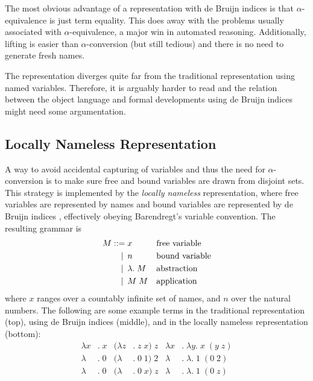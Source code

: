 \documentclass[a4paper,11pt]{article}
\begin{document}
The most obvious advantage of a representation with de Bruijn
indices is that $\alpha$-equivalence is just term equality.
This does away with the problems usually associated with
$\alpha$-equivalence, a major win in automated reasoning.
Additionally, lifting is easier than $\alpha$-conversion (but
still tedious) and there is no need to generate fresh names.

The representation diverges quite far from the traditional
representation using named variables.
Therefore, it is arguably harder to read and the relation
between the object language and formal developments using de
Bruijn indices might need some argumentation.


\subsection{Locally Nameless Representation}

A way to avoid accidental capturing of variables and thus the need for
$\alpha$-conversion is to make sure free and bound variables are drawn
from disjoint sets.
This strategy is implemented by the {\em locally nameless} representation,
where free variables are represented by names and bound variables are
represented by de Bruijn indices \cite{McBride-McKinna-04}, effectively
obeying Barendregt's variable convention.
The resulting grammar is
\begin{align*}
  M ::=             &\; x
  && \text{free variable} \\
  \llap{\textbar\:} &\; n
  && \text{bound variable} \\
  \llap{\textbar\:} &\; \lambda . \; M
    && \text{abstraction} \\
  \llap{\textbar\:} &\; M \; M
  && \text{application}
\end{align*}
where $x$ ranges over a countably infinite set of names, and $n$ over
the natural numbers.
The following are some example terms in the traditional representation
(top), using de Bruijn indices (middle), and in the locally nameless
representation (bottom):
\begin{align*}
  \lambda x&. \; x & (\lambda z&. \; z \; x) \; z & \lambda x&. \; \lambda y. \; x \; (y \; z)\\
  \lambda &. \; 0  & (\lambda &. \; 0 \; 1) \; 2  & \lambda &. \; \lambda . \; 1 \; (0 \; 2)\\
  \lambda &. \; 0  & (\lambda &. \; 0 \; x) \; z  & \lambda &. \; \lambda . \; 1 \; (0 \; z)
\end{align*}
\end{document}
